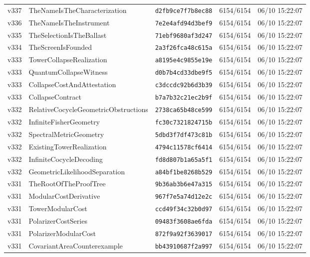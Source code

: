 \documentclass[11pt]{article}
\theoremstyle{definition}\newtheorem{deriv}{Derivação}
\begin{document}
{\begin{longtable}{@{}lllll@{}}
v337 & TheNameIsTheCharacterization & \texttt{d2fb9ce7f7b8ec88} & 6154/6154 & 06/10 15:22:07 \\
v336 & TheNameIsTheInstrument & \texttt{7e2e4afd94d3bef9} & 6154/6154 & 06/10 15:22:07 \\
v335 & TheSelectionIsTheBallast & \texttt{71ebf9680af3d247} & 6154/6154 & 06/10 15:22:07 \\
v334 & TheScreenIsFounded & \texttt{2a3f26fca48c615a} & 6154/6154 & 06/10 15:22:07 \\
v333 & TowerCollapseRealization & \texttt{a8195e4c9855e19e} & 6154/6154 & 06/10 15:22:07 \\
v333 & QuantumCollapseWitness & \texttt{d0b7b4cd33dbe9f5} & 6154/6154 & 06/10 15:22:07 \\
v333 & CollapseCostAndAttestation & \texttt{c3dccdc92b6d3b39} & 6154/6154 & 06/10 15:22:07 \\
v333 & CollapseContract & \texttt{b7a7b32c21ec2b9f} & 6154/6154 & 06/10 15:22:07 \\
v332 & RelativeCocycleGeometricObstructions & \texttt{2738ca65b48ce599} & 6154/6154 & 06/10 15:22:07 \\
v332 & InfiniteFisherGeometry & \texttt{fc30c7321824715b} & 6154/6154 & 06/10 15:22:07 \\
v332 & SpectralMetricGeometry & \texttt{5dbd3f7df473c81b} & 6154/6154 & 06/10 15:22:07 \\
v332 & ExistingTowerRealization & \texttt{4794c11578cf6414} & 6154/6154 & 06/10 15:22:07 \\
v332 & InfiniteCocycleDecoding & \texttt{fd8d807b1a65a5f1} & 6154/6154 & 06/10 15:22:07 \\
v332 & GeometricLikelihoodSeparation & \texttt{a84bf1be8268b529} & 6154/6154 & 06/10 15:22:07 \\
v331 & TheRootOfTheProofTree & \texttt{9b36ab3b6e47a315} & 6154/6154 & 06/10 15:22:07 \\
v331 & ModularCostDerivative & \texttt{967f7e5a74d12e2c} & 6154/6154 & 06/10 15:22:07 \\
v331 & TowerModularCost & \texttt{ccd49f34c32b0d97} & 6154/6154 & 06/10 15:22:07 \\
v331 & PolarizerCostSeries & \texttt{09483f3608ae6fda} & 6154/6154 & 06/10 15:22:07 \\
v331 & PolarizerModularCost & \texttt{872f9a92f3639017} & 6154/6154 & 06/10 15:22:07 \\
v331 & CovariantAreaCounterexample & \texttt{bb43910687f2a997} & 6154/6154 & 06/10 15:22:07 \\

\end{longtable}}
\end{document}
